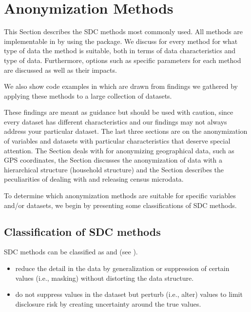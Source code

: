 \documentclass[letterpaper,10pt,english]{sphinxmanual}
\begin{document}
\chapter{Anonymization Methods}
\label{\detokenize{anon_methods::doc}}\label{\detokenize{anon_methods:anonymization-methods}}
This Section describes the SDC methods most commonly used. All methods
are implementable in  by using the  package. We discuss for
every method for what type of data the method is suitable, both in terms
of data characteristics and type of data. Furthermore, options such as
specific parameters for each method are discussed as well as their
impacts. %
\begin{footnote}[1]\sphinxAtStartFootnote
We also show code examples in  which are drawn from findings we
gathered by applying these methods to a large collection of datasets.
%
\end{footnote} These findings are meant as guidance but
should be used with caution, since every dataset has different
characteristics and our findings may not always address your particular
dataset. The last three sections are on the
anonymization of variables and datasets with particular characteristics
that deserve special attention. The Section
{\hyperref[\detokenize{anon_methods:anonymization-of-geospatial-variables}]{}}
deals with for anonymizing
geographical data, such as GPS coordinates, the Section
{\hyperref[\detokenize{anon_methods:anonymization-of-the-quasi-identifier-household-size}]{}} discusses the
anonymization of data with a hierarchical structure (household
structure) and the Section
{\hyperref[\detokenize{anon_methods:special-case-census-data}]{}} describes the peculiarities of dealing with
and releasing census microdata.

To determine which anonymization methods are suitable for specific
variables and/or datasets, we begin by presenting some classifications
of SDC methods.


\section{Classification of SDC methods}
\label{\detokenize{anon_methods:classification-of-sdc-methods}}
SDC methods can be classified as  and
 (see {\hyperref[\detokenize{anon_methods:hdfg12}]{}}).
\begin{itemize}
\item {} 
 reduce the detail in the data by
generalization or suppression of certain values (i.e., masking)
without distorting the data structure.

\item {} 
 do not suppress values in the dataset but
perturb (i.e., alter) values to limit disclosure risk by creating
uncertainty around the true values.

\end{itemize}
\end{document}
